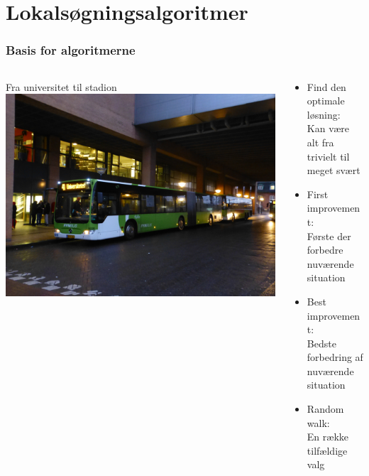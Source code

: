 \documentclass[smaller,handouts]{beamer}
\newcommand{\vertex}{\node[vertex]}
\begin{document}
% 
% 
% 
\section{Lokalsøgningsalgoritmer}
\begin{frame}
 \frametitle{Basis for algoritmerne}
 \begin{columns}[T]
  \begin{column}[T]{0.5\linewidth}
  \centering
  Fra universitet til stadion \medskip \\
  \includegraphics[scale=0.06]{fynbus.JPG}
  \end{column}
\begin{column}[T]{0.5\linewidth}
\begin{itemize}[<+->]
 \item Find den optimale løsning:  \\
 Kan være alt fra trivielt til meget svært 
 \item First improvement: \\ 
 Første der forbedre nuværende situation
 \item Best improvement: \\ 
 Bedste forbedring af nuværende situation
 \item Random walk: \\
 En række tilfældige valg
\end{itemize}
  \end{column}
 \end{columns}

\end{frame}
\end{document}
